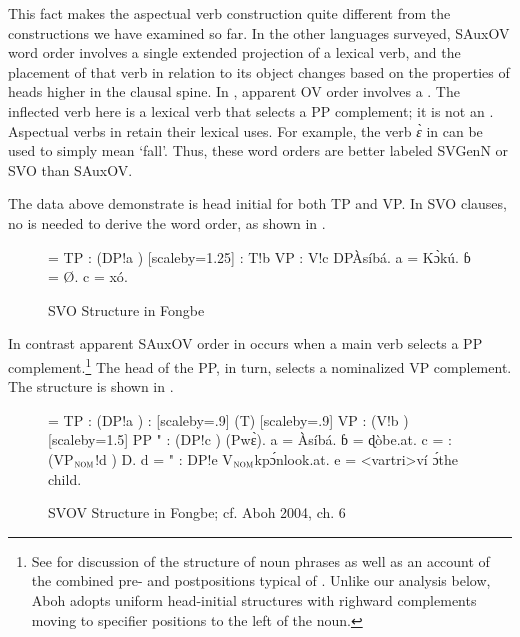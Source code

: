 \documentclass[output=paper,newtxmath,modfonts,nonflat,draftmode]{langsci/langscibook}
\begin{document}
This fact makes the  aspectual verb construction quite different from the constructions we have examined so far. In the other languages surveyed, SAuxOV word order involves a single extended projection of a lexical verb, and the placement of that verb in relation to its object changes based on the properties of heads higher in the clausal spine. In , apparent OV order involves a . The inflected verb here is a lexical verb that selects a PP complement; it is not an . Aspectual verbs in  retain their lexical uses. For example, the verb \textit{{\`ɛ}} in  can be used to simply mean `fall'. Thus, these word orders are better labeled SVGenN or SVO than SAuxOV.

The data above demonstrate  is head initial for both TP and VP. In SVO clauses, no  is needed to derive the word order, as shown in . 

\begin{figure}
{\footnotesize \jtree[xunit=2.5em,yunit=1.25em]
\! = {TP}
: ({DP}!a ) [scaleby=1.25]
: {T}!b {VP}
: {V}!c {DP}{Àsíbá}.
\!a = {K{{\`ɔ}kú}}.
ɓ = {\O{}}.
\!c = {xó}.
\endjtree}
\caption{SVO Structure in Fongbe}
\label{fig:sande:Fongbe-SAuxVO}
\end{figure}

In contrast apparent SAuxOV order in  occurs when a main verb selects a PP complement.\footnote{See \citet{aboh10} for discussion of the structure of  noun phrases as well as an account of the combined pre- and postpositions typical of . Unlike our analysis below, Aboh adopts uniform head-initial structures with righward complements moving to specifier positions to the left of the noun.} The head of the PP, in turn, selects a nominalized VP complement. The structure is shown in .

\begin{figure}
{\footnotesize \jtree[xunit=2.5em,yunit=1.25em]
\! = {TP}
: ({DP}!a )
: [scaleby=.9] ({T}) [scaleby=.9] {VP}
: ({V}!b ) [scaleby=1.5] {PP}
"{} : ({DP}!c ) ({P}{{w{\`ɛ}}}).
\!a = {Àsíbá}.
ɓ = {{ɖò}}{be.at}.
\!c = : ({VP$_{\textsc{nom}}$}!d ) {D}.
\!d = "{} : {DP}!e  {V$_{\textsc{nom}}$}{{kp{\'ɔ}n}}{look.at}.
\!e = <vartri>{ví {\'ɔ}}{the child}.
\endjtree}
\caption{SVOV Structure in Fongbe; cf. Aboh 2004, ch. 6}
\label{fig:sande:Fongbe-SVOV}
\end{figure}
\end{document}
